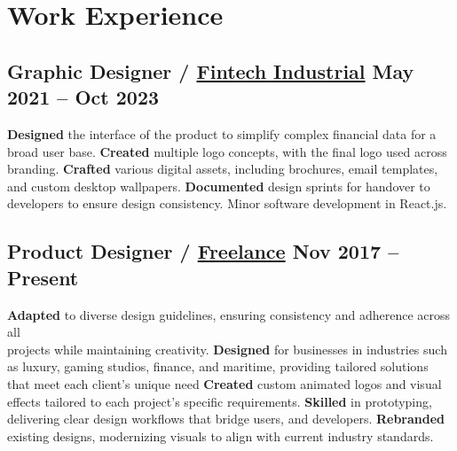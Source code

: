 \section*{Work Experience}
%
%
%
\subsection*{
  Graphic Designer / \href{https://www.linkedin.com/company/fintech-industrial/}{Fintech Industrial}
  \hspace*{\fill}
  \dateformat May 2021 -- Oct 2023
}
\begin{tasks}
  \task \textbf{Designed} the interface of the product to simplify complex financial data for a broad user base.
  \task \textbf{Created} multiple logo concepts, with the final logo used across branding.
  \task \textbf{Crafted} various digital assets, including brochures, email templates, and custom desktop wallpapers.
  \task \textbf{Documented} design sprints for handover to developers to ensure design consistency.
  \task Minor software development in React.js.
\end{tasks}
%
%
\subsection*{
  Product Designer / \href{https://bumbleboss.xyz/}{Freelance}
  \hspace*{\fill}
  \dateformat Nov 2017 -- Present
}
\begin{tasks}
  \task \textbf{Adapted} to diverse design guidelines, ensuring consistency and adherence across all\\projects while maintaining creativity.
  \task \textbf{Designed} for businesses in industries such as luxury, gaming studios, finance, and maritime, providing tailored solutions that meet each client's unique need
  \task \textbf{Created} custom animated logos and visual effects tailored to each project's specific requirements.
  \task \textbf{Skilled} in prototyping, delivering clear design workflows that bridge users, and developers.
  \task \textbf{Rebranded} existing designs, modernizing visuals to align with current industry standards.
\end{tasks}
%
%